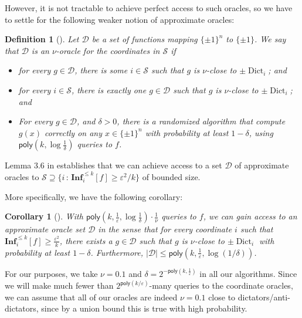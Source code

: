 \documentclass[10pt,a4paper]{article}
\providecommand{\poly}{\mathsf{poly}}
\theoremstyle{plain}
\newtheorem{corollary}[theorem]{Corollary}
\newtheorem{definition}[theorem]{Definition}
\theoremstyle{remark}
\theoremstyle{plain}
\newcommand\Inf{{\mathbf{Inf}}}
\newcommand{\eps}{\varepsilon}
\newcommand{\pmone}{\{\pm 1\}}
\newcommand{\calS}{\mathcal{S}}
\newcommand{\Dict}{\operatorname{Dict}}
\newcommand{\InfluentialCoords}{\calS}
\newcommand{\InfluentialOracles}{\mathcal{D}}
\renewcommand{\epsilon}{\varepsilon}
\begin{document}
However, it is not tractable to achieve perfect access to such oracles, so we have to settle for the following weaker notion of approximate oracles:
\begin{definition}[]
\label{definition:approx-oracles}
Let $\InfluentialOracles$ be a set of functions mapping $\{ \pm 1\}^n$ to $\{ \pm 1\}$. We say that $\InfluentialOracles$ is an $\nu$-oracle for the coordinates in $\InfluentialCoords$ if

\begin{itemize}
    \item for every $g \in \InfluentialOracles$, there is some $i \in \InfluentialCoords$ such that $g$ is $\nu$-close to $\pm \Dict_i$; and
    \item for every $i \in \InfluentialCoords$, there is exactly one $g \in \InfluentialOracles$ such that $g$  is $\nu$-close to $\pm \Dict_i$; and
    \item For every $g \in \InfluentialOracles$, and $\delta > 0$, there is a randomized algorithm that compute $g(x)$ correctly on any $x \in \pmone^n$ with probability at least $1-\delta$, using $\poly(k, \log \frac{1}{\delta})$ queries to $f$.
\end{itemize}
\end{definition}


 Lemma 3.6 in \cite{junta-coordinate-oracles} establishes that we can achieve access to a set $\InfluentialOracles$ of approximate oracles to $\InfluentialCoords \supseteq \{i\,: \, \Inf_i^{\leq k}[f] \geq \epsilon^2/k\}$ of bounded size. 

More specifically, we have the following corollary:

\begin{corollary}[]
\label{corollary:get-oracles}
With $\poly(k, \frac{1}{\epsilon}, \log \frac{1}{\delta})\cdot \frac{1}{\nu}$ queries to $f$, we can gain access to an approximate oracle set $\InfluentialOracles$ in the sense that for every coordinate $i$ such that $\Inf_i^{\leq k}[f] \geq \frac{\epsilon^2}{k}$, there exists a $g \in \InfluentialOracles$ such that $g$ is $\nu$-close to $\pm \Dict_i$ with probability at least $1-\delta$. Furthermore, $|\InfluentialOracles|\leq \poly(k, \frac{1}{\epsilon}, \log(1/\delta))$.
\end{corollary}

For our purposes, we take $\nu = 0.1$ and $\delta = 2^{-\poly(k, \frac{1}{\epsilon})}$ in all our  algorithms. Since we will  make much fewer than $2^{\poly(k/\eps)}$-many queries to the coordinate oracles,  we can assume that all of our oracles are indeed $\nu = 0.1$ close to dictators/anti-dictators, since by a union bound this is true with high probability.
\end{document}
